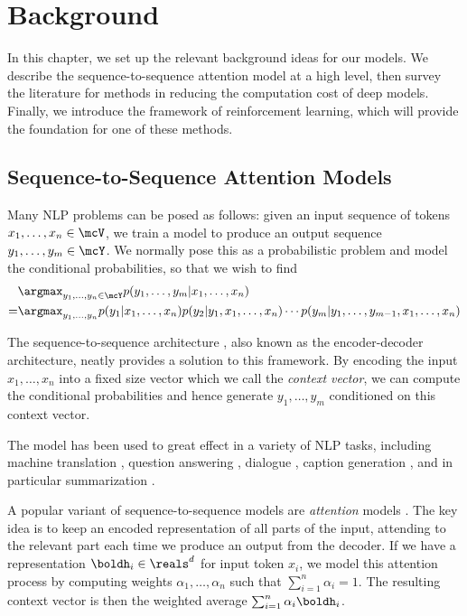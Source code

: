 \documentclass[12pt]{report}
\begin{document}

\chapter{Background}
\label{chap:background}

In this chapter, we set up the relevant background ideas for our models. We describe the sequence-to-sequence attention model at a high level, then survey the literature for methods in reducing the computation cost of deep models. Finally, we introduce the framework of reinforcement learning, which will provide the foundation for one of these methods.

\section{Sequence-to-Sequence Attention Models}

Many NLP problems can be posed as follows: given an input sequence of tokens $x_1, \ldots, x_n \in \mcV$, we train a model to produce an output sequence $y_1, \ldots, y_m \in \mcY$. We normally pose this as a probabilistic problem and model the conditional probabilities, so that we wish to find
\begin{equation}
\begin{split}
&\argmax_{y_1, \ldots, y_n \in \mcY} p(y_1, \ldots, y_m | x_1, \ldots, x_n) \\
= & \argmax_{y_1, \ldots, y_n} p(y_1 | x_1, \ldots, x_n)p(y_2 | y_1, x_1, \ldots, x_n) \cdots p(y_m | y_1, \ldots, y_{m-1}, x_1, \ldots, x_n)
\end{split}
\end{equation}

The sequence-to-sequence architecture \citep{sutskever2014sequence}, also known as the encoder-decoder architecture, neatly provides a solution to this framework. By encoding the input $x_1, \ldots, x_n$ into a fixed size vector which we call the \emph{context vector}, we can compute the conditional probabilities and hence generate $y_1, \ldots, y_m$ conditioned on this context vector.

The model has been used to great effect in a variety of NLP tasks, including machine translation \citep{sutskever2014sequence, bahdanau2014neural}, question answering \citep{Hermann2015}, dialogue \citep{li2016persona}, caption generation \citep{xu2015captioning}, and in particular summarization \citep{rush2015neural}.


A popular variant of sequence-to-sequence models are \emph{attention} models \citep{bahdanau2014neural}. The key idea is to keep an encoded representation of all parts of the input, attending to the relevant part each time we produce an output from the decoder. If we have a representation $\boldh_i \in \reals^d$ for input token $x_i$, we model this attention process by computing weights $\alpha_1, \ldots, \alpha_n$ such that $\sum_{i=1}^n \alpha_i = 1$. The resulting context vector is then the weighted average $\sum_{i=1}^n \alpha_i \boldh_i$.
\end{document}
